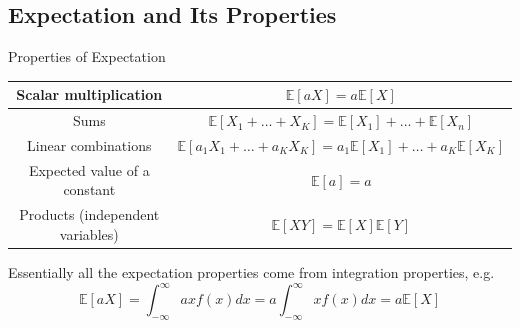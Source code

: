 \documentclass{beamer}
\begin{document}
\subsection{Expectation and Its Properties}
\begin{frame}{Properties of Expectation}
	\renewcommand{\arraystretch}{1.4}
	{\tiny {\tiny }}{
		\begin{table}[bt]
			\begin{tabular}{|c|c|} \hline
				Scalar multiplication & $\mathbb{E}[aX] = a\mathbb{E}[X]$ \\ \hline
				Sums & $\mathbb{E}[X_1+\ldots +X_K] =  \mathbb{E}[X_1] +\ldots + \mathbb{E}[X_n]$ \\ \hline
				Linear combinations & $\mathbb{E}[a_1X_1+\ldots +a_KX_K] =  a_1\mathbb{E}[X_1] +\ldots + a_K\mathbb{E}[X_K]$ \\ \hline
				Expected value of a constant & $\mathbb{E}[a] = a$ \\ \hline
				Products (independent variables) & $\mathbb{E}[XY] = \mathbb{E}[X] \mathbb{E}[Y]$ \\ \hline
			\end{tabular}
		\end{table}
	}
	Essentially all the expectation properties come from integration properties, e.g.
	\begin{equation*}
		\mathbb{E}[aX] = \int_{-\infty}^{\infty} ax f(x) dx = a  \int_{-\infty}^{\infty} x f(x) dx = a\mathbb{E}[X]
	\end{equation*}
\end{frame}
\end{document}

